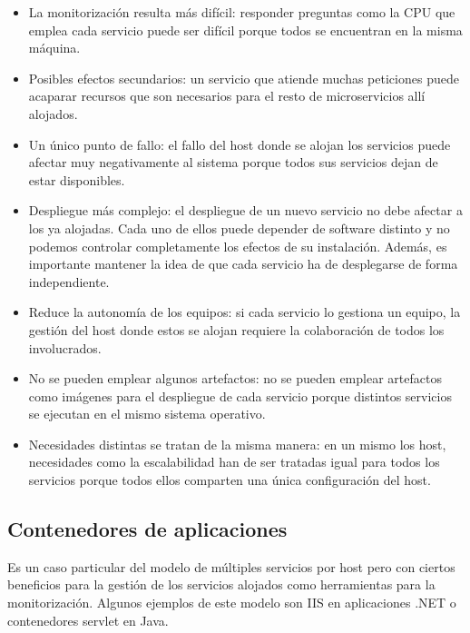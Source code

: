 \documentclass[11pt,a4paper]{article}
\begin{document}
\begin{itemize}

\item La monitorización resulta más difícil: responder preguntas como la CPU que emplea cada servicio puede ser difícil porque todos se encuentran en la misma máquina.

\item Posibles efectos secundarios: un servicio que atiende muchas peticiones puede acaparar recursos que son necesarios para el resto de microservicios allí alojados.

\item Un único punto de fallo: el fallo del host donde se alojan los servicios puede afectar muy negativamente al sistema porque todos sus servicios dejan de estar disponibles.

\item Despliegue más complejo: el despliegue de un nuevo servicio no debe afectar a los ya alojadas. Cada uno de ellos puede depender de software distinto y no podemos controlar completamente los efectos de su instalación. Además, es importante mantener la idea de que cada servicio ha de desplegarse de forma independiente.

\item Reduce la autonomía de los equipos: si cada servicio lo gestiona un equipo, la gestión del host donde estos se alojan requiere la colaboración de todos los involucrados.

\item No se pueden emplear algunos artefactos: no se pueden emplear artefactos como imágenes para el despliegue de cada servicio porque distintos servicios se ejecutan en el mismo sistema operativo.

\item Necesidades distintas se tratan de la misma manera: en un mismo los host, necesidades como la escalabilidad han de ser tratadas igual para todos los servicios porque todos ellos comparten una única configuración del host.

\end{itemize}

\subsection{Contenedores de aplicaciones}

Es un caso particular del modelo de múltiples servicios por host pero con ciertos beneficios para la gestión de los servicios alojados como herramientas para la monitorización. Algunos ejemplos de este modelo son IIS en aplicaciones .NET o contenedores servlet en Java.
\end{document}
